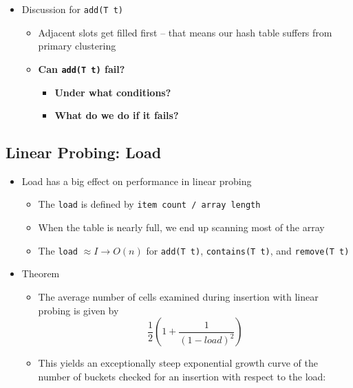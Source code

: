 \documentclass[
  10pt,
  english,
  letterpaper,
,tablecaptionabove
]{scrartcl}
\newcommand{\passthrough}[1]{#1}
\providecommand{\tightlist}{%
  \setlength{\itemsep}{0pt}\setlength{\parskip}{0pt}}
\begin{document}
\begin{itemize}
\tightlist
\item
  Discussion for \passthrough{\lstinline!add(T t)!}

  \begin{itemize}
  \tightlist
  \item
    Adjacent slots get filled first -- that means our hash table suffers
    from primary clustering
  \item
    \textbf{Can \passthrough{\lstinline!add(T t)!} fail?}

    \begin{itemize}
    \tightlist
    \item
      \textbf{Under what conditions?}
    \item
      \textbf{What do we do if it fails?}
    \end{itemize}
  \end{itemize}
\end{itemize}

\hypertarget{linear-probing-load}{%
\subsection{Linear Probing: Load}\label{linear-probing-load}}

\begin{itemize}
\tightlist
\item
  Load has a big effect on performance in linear probing

  \begin{itemize}
  \tightlist
  \item
    The \passthrough{\lstinline!load!} is defined by
    \passthrough{\lstinline!item count / array length!}
  \item
    When the table is nearly full, we end up scanning most of the array
  \item
    The \passthrough{\lstinline!load!} \(\approx I \rightarrow O(n)\)
    for \passthrough{\lstinline!add(T t)!},
    \passthrough{\lstinline!contains(T t)!}, and
    \passthrough{\lstinline!remove(T t)!}
  \end{itemize}
\item
  Theorem

  \begin{itemize}
  \tightlist
  \item
    The average number of cells examined during insertion with linear
    probing is given by
    \[ \frac{1}{2} \left(1 + \frac{1}{(1-load)^2}\right)\]
  \item
    This yields an exceptionally steep exponential growth curve of the
    number of buckets checked for an insertion with respect to the load:
  \end{itemize}
\end{itemize}
\end{document}
